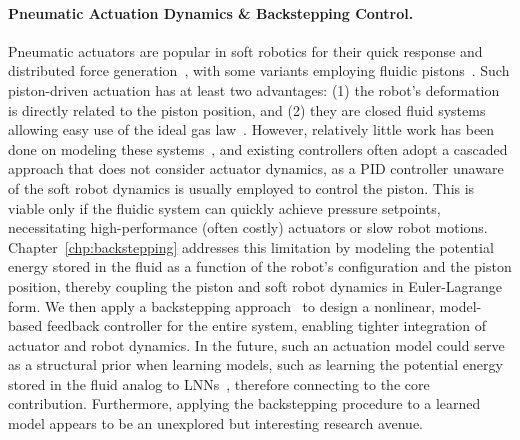 \paragraph{Pneumatic Actuation Dynamics \& Backstepping Control.}
Pneumatic actuators are popular in soft robotics for their quick response and distributed force generation~\citep{marchese2015recipe, zaidi2021actuation}, with some variants employing fluidic pistons~\citep{marchese2014design, marchese2016design, parlikar2024concept, malas2024novel}. Such piston-driven actuation has at least two advantages: (1) the robot’s deformation is directly related to the piston position, and (2) they are closed fluid systems allowing easy use of the ideal gas law~\citep{marchese2016design}. However, relatively little work has been done on modeling these systems~\citep{marchese2014design, xavier2020modelling}, and existing controllers often adopt a cascaded approach that does not consider actuator dynamics, as a PID controller unaware of the soft robot dynamics is usually employed to control the piston. This is viable only if the fluidic system can quickly achieve pressure setpoints, necessitating high-performance (often costly) actuators or slow robot motions.
%
Chapter~\ref{chp:backstepping} addresses this limitation by modeling the potential energy stored in the fluid as a function of the robot’s configuration and the piston position, thereby coupling the piston and soft robot dynamics in Euler-Lagrange form. We then apply a backstepping approach~\citep{kokotovic1992joy, lozano1992adaptive, khalil2002nonlinear} to design a nonlinear, model-based feedback controller for the entire system, enabling tighter integration of actuator and robot dynamics.
In the future, such an actuation model could serve as a structural prior when learning models, such as learning the potential energy stored in the fluid analog to \glspl{LNN}~\citep{lutter2019deep}, therefore connecting to the core contribution. Furthermore, applying the backstepping procedure to a learned model appears to be an unexplored but interesting research avenue.


